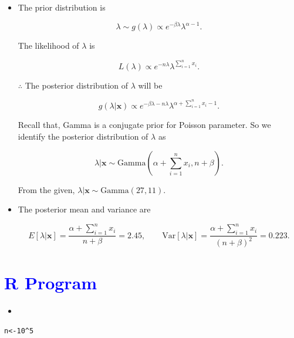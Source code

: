 \documentclass[11pt, a4paper]{article}\usepackage[]{graphicx}\usepackage[]{xcolor}
\makeatletter
\newcommand{\hlnum}[1]{\textcolor[rgb]{0.686,0.059,0.569}{#1}}%
\newcommand{\hlopt}[1]{\textcolor[rgb]{0,0,0}{#1}}%
\newcommand{\hldef}[1]{\textcolor[rgb]{0.345,0.345,0.345}{#1}}%
\newcommand{\hlkwb}[1]{\textcolor[rgb]{0.69,0.353,0.396}{#1}}%
\newenvironment{kframe}{%
 \def\at@end@of@kframe{}%
 \ifinner\ifhmode%
  \def\at@end@of@kframe{\end{minipage}}%
  \begin{minipage}{\columnwidth}%
 \fi\fi%
 \def\FrameCommand##1{\hskip\@totalleftmargin \hskip-\fboxsep
 \colorbox{shadecolor}{##1}\hskip-\fboxsep
     \hskip-\linewidth \hskip-\@totalleftmargin \hskip\columnwidth}%
 \MakeFramed {\advance\hsize-\width
   \@totalleftmargin\z@ \linewidth\hsize
   \@setminipage}}%
 {\par\unskip\endMakeFramed%
 \at@end@of@kframe}
\newenvironment{knitrout}{}{} %
\makeatother
\begin{document}
\begin{itemize}
\item[\scalebox{2.0}{\twemoji{keycap: 1}}] \hspace{0.1cm} The prior distribution is 

$$\lambda \sim g(\lambda) \propto e^{-\beta \lambda} {\lambda}^{\alpha - 1}.$$

The likelihood of $\lambda$ is

$$L(\lambda) \propto e^{-n \lambda} {\lambda}^{\sum \limits_{i = 1}^{n} x_i}.$$

$\therefore$ The posterior distribution of $\lambda$ will be

$$g(\lambda | \mathbf{x}) \propto e^{-\beta \lambda - n \lambda } {\lambda}^{\alpha + \sum \limits_{i = 1}^{n} x_i - 1}.$$

Recall that, Gamma is a conjugate prior for Poisson parameter. So we identify the posterior distribution of $\lambda$ as

$$\lambda | \mathbf{x} \sim \text{Gamma}\left( \alpha + \sum \limits_{i = 1}^{n} x_i, n + \beta \right).$$

From the given, $\lambda | \mathbf{x} \sim \text{Gamma}(27, 11)$.

\item[\scalebox{2.0}{\twemoji{keycap: 2}}] \hspace{0.1cm} The posterior mean and variance are

$$E[\lambda | \mathbf{x}] = \dfrac{\alpha + \sum \limits_{i = 1}^{n} x_i}{n + \beta} = 2.45, \qquad \text{Var}[\lambda | \mathbf{x}] = \dfrac{\alpha + \sum \limits_{i = 1}^{n} x_i}{(n + \beta)^2} = 0.223.$$
\end{itemize}

\newpage

\section*{\faArrowAltCircleRight[regular] \textcolor{blue}{R Program}}





\begin{itemize}
\item[\scalebox{2.0}{\twemoji{keycap: 3}}]
\end{itemize}

\begin{knitrout}
\color{fgcolor}\begin{kframe}
\begin{alltt}
\hldef{n} \hlkwb{<-} \hlnum{10}\hlopt{^}\hlnum{5}
\end{alltt}
\end{kframe}
\end{knitrout}
\end{document}
